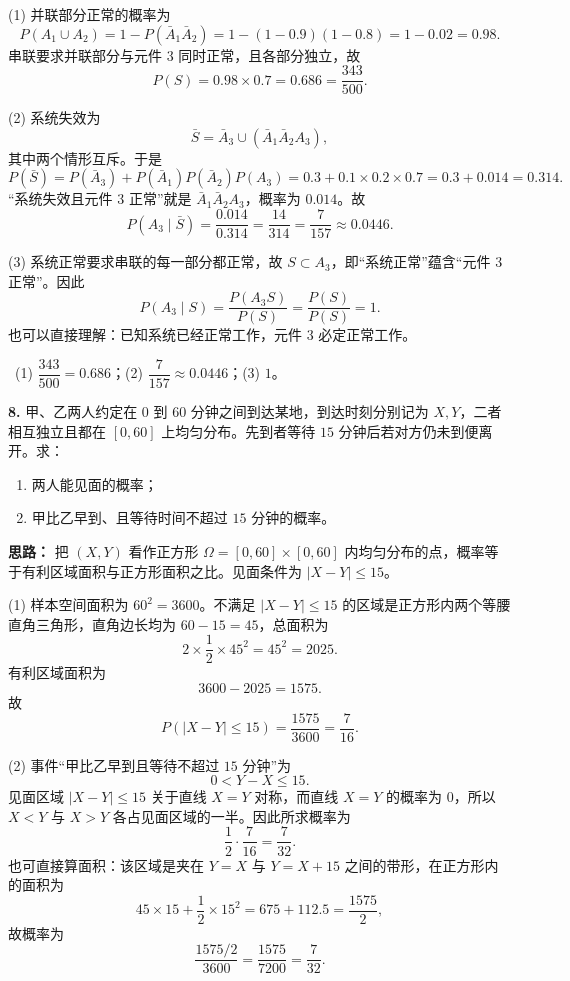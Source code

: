 (1) 并联部分正常的概率为
\[
P(A_1\cup A_2)=1-P(\bar A_1\bar A_2)=1-(1-0.9)(1-0.8)=1-0.02=0.98.
\]
串联要求并联部分与元件 $3$ 同时正常，且各部分独立，故
\[
P(S)=0.98\times0.7=0.686=\frac{343}{500}.
\]

(2) 系统失效为
\[
\bar S=\bar A_3\cup(\bar A_1\bar A_2A_3),
\]
其中两个情形互斥。于是
\[
P(\bar S)=P(\bar A_3)+P(\bar A_1)P(\bar A_2)P(A_3)
=0.3+0.1\times0.2\times0.7=0.3+0.014=0.314.
\]
“系统失效且元件 $3$ 正常”就是 $\bar A_1\bar A_2A_3$，概率为 $0.014$。故
\[
P(A_3\mid\bar S)=\frac{0.014}{0.314}=\frac{14}{314}=\frac{7}{157}\approx0.0446.
\]

(3) 系统正常要求串联的每一部分都正常，故 $S\subset A_3$，即“系统正常”蕴含“元件 $3$ 正常”。因此
\[
P(A_3\mid S)=\frac{P(A_3S)}{P(S)}=\frac{P(S)}{P(S)}=1.
\]
也可以直接理解：已知系统已经正常工作，元件 $3$ 必定正常工作。

\ (1) $\dfrac{343}{500}=0.686$；(2) $\dfrac{7}{157}\approx0.0446$；(3) $1$。

\else \answerarea[10] \fi%

\textbf{8.} 甲、乙两人约定在 $0$ 到 $60$ 分钟之间到达某地，到达时刻分别记为 $X,Y$，二者相互独立且都在 $[0,60]$ 上均匀分布。先到者等待 $15$ 分钟后若对方仍未到便离开。求：
\begin{enumerate}[label=(\arabic*)]
    \item 两人能见面的概率；
    \item 甲比乙早到、且等待时间不超过 $15$ 分钟的概率。
\end{enumerate}

\ifshowsolutions%
\textbf{思路：} 把 $(X,Y)$ 看作正方形 $\Omega=[0,60]\times[0,60]$ 内均匀分布的点，概率等于有利区域面积与正方形面积之比。见面条件为 $|X-Y|\le 15$。

(1) 样本空间面积为 $60^2=3600$。不满足 $|X-Y|\le15$ 的区域是正方形内两个等腰直角三角形，直角边长均为 $60-15=45$，总面积为
\[
2\times\frac12\times45^2=45^2=2025.
\]
有利区域面积为
\[
3600-2025=1575.
\]
故
\[
P(|X-Y|\le15)=\frac{1575}{3600}=\frac{7}{16}.
\]

(2) 事件“甲比乙早到且等待不超过 $15$ 分钟”为
\[
0<Y-X\le 15.
\]
见面区域 $|X-Y|\le15$ 关于直线 $X=Y$ 对称，而直线 $X=Y$ 的概率为 $0$，所以 $X<Y$ 与 $X>Y$ 各占见面区域的一半。因此所求概率为
\[
\frac12\cdot\frac{7}{16}=\frac{7}{32}.
\]
也可直接算面积：该区域是夹在 $Y=X$ 与 $Y=X+15$ 之间的带形，在正方形内的面积为
\[
45\times15+\frac12\times15^2=675+112.5=\frac{1575}{2},
\]
故概率为
\[
\frac{1575/2}{3600}=\frac{1575}{7200}=\frac{7}{32}.
\]

